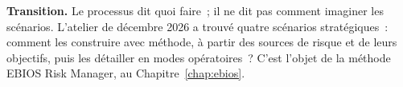\begin{boxinfo}
\textbf{Transition.} Le processus dit quoi faire~; il ne dit pas comment
imaginer les scénarios. L'atelier de décembre 2026 a trouvé quatre
scénarios stratégiques~: comment les construire avec méthode, à partir des
sources de risque et de leurs objectifs, puis les détailler en modes
opératoires~? C'est l'objet de la méthode EBIOS Risk Manager, au
Chapitre~\ref{chap:ebios}.
\end{boxinfo}
